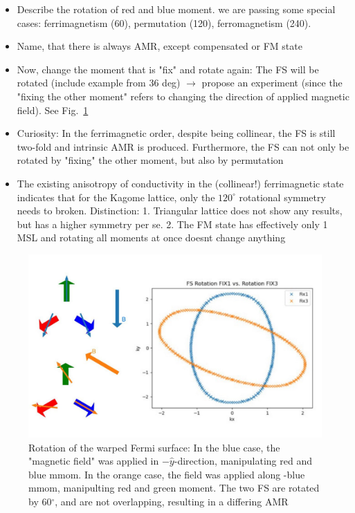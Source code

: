 \documentclass[prb,showpacs,amsmath,amssymb,superscriptaddress,twocolumn,floatfix]{revtex4-1}
\begin{document}
{\color{red} \begin{itemize}
	\item Describe the rotation of red and blue moment. we are passing some special cases: ferrimagnetism (60), permutation (120), ferromagnetism (240). 
	\item Name, that there is always AMR, except compensated or FM state
	\item Now, change the moment that is "fix" and rotate again: The FS will be rotated (include example from 36 deg) $\rightarrow$ propose an experiment (since the "fixing the other moment" refers to changing the direction of applied magnetic field). See Fig.~\ref{fig:fs-rotation}
	\item Curiosity: In the ferrimagnetic order, despite being collinear, the FS is still two-fold and intrinsic AMR is produced. Furthermore, the FS can not only be rotated by "fixing" the other moment, but also by permutation
	\item The existing anisotropy of conductivity in the (collinear!) ferrimagnetic state indicates that for the Kagome lattice, only the $120^\circ$ rotational symmetry needs to broken. Distinction: 1. Triangular lattice does not show any results, but has a higher symmetry per se. 2. The FM state has effectively only 1 MSL and rotating all moments at once doesnt change anything
\end{itemize} }

\begin{figure}
	\centering
	\includegraphics[width=0.7\linewidth]{img/FS-rotation}
	\caption{Rotation of the warped Fermi surface: In the blue case, the "magnetic field" was applied in $-\hat{y}$-direction, manipulating red and blue mmom. In the orange case, the field was applied along -blue mmom, manipulting red and green moment. The two FS are rotated by 60$^\circ$, and are not overlapping, resulting in a differing AMR}
	\label{fig:fs-rotation}
\end{figure}
\end{document}
